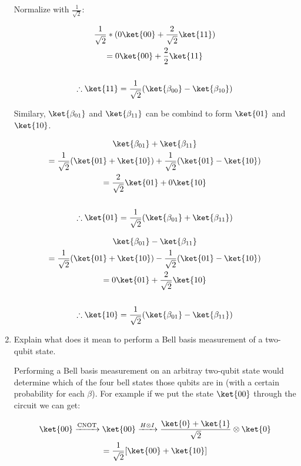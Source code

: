 \documentclass[]{article}
\begin{document}
\begin{enumerate}
        Normalize with $\frac{1}{\sqrt{2}}$:

        \begin{gather*}
          \frac{1}{\sqrt{2}} * (0  \ket{00} + \frac{2}{\sqrt{2}} \ket{11})\\
          =  0 \ket{00} + \frac{2}{2} \ket{11} \\ \\
          \therefore \ket{11} = \frac{1}{\sqrt{2}}(\ket{\beta_{00}} - \ket{\beta_{10}})
        \end{gather*}
        
        Similary, $\ket{\beta_{01}}$ and $\ket{\beta_{11}}$ can be combind to form $\ket{01}$ and $\ket{10}$.

        \begin{gather*}
          \ket{\beta_{01}} + \ket{\beta_{11}} \\
          = \frac{1}{\sqrt{2}} (\ket{01} + \ket{10}) + \frac{1}{\sqrt{2}} (\ket{01} - \ket{10})\\
          = \frac{2}{\sqrt{2}} \ket{01} + 0 \ket{10} \\ \\
          \therefore \ket{01} = \frac{1}{\sqrt{2}}(\ket{\beta_{01}} + \ket{\beta_{11}})
        \end{gather*}

        \begin{gather*}
          \ket{\beta_{01}} - \ket{\beta_{11}} \\
          = \frac{1}{\sqrt{2}} (\ket{01} + \ket{10}) - \frac{1}{\sqrt{2}} (\ket{01} - \ket{10})\\
          = 0 \ket{01} + \frac{2}{\sqrt{2}} \ket{10} \\ \\
          \therefore \ket{10} = \frac{1}{\sqrt{2}}(\ket{\beta_{01}} - \ket{\beta_{11}})
        \end{gather*}

  \item Explain what does it mean to perform a Bell basis measurement of a two-qubit state.

    Performing a Bell basis measurement on an arbitray two-qubit state would determine which of 
    the four bell states those qubits are in (with a certain probability for each $\beta$). For 
    example if we put the state $\ket{00}$ through the circuit we can get:

    \begin{gather*}
      \ket{00} \xrightarrow{\text{CNOT}} \ket{00} \xrightarrow{H \otimes I} 
      \frac{\ket{0} + \ket{1}}{\sqrt{2}} \otimes \ket{0}\\
      = \frac{1}{\sqrt{2}}[\ket{00} + \ket{10}]
    \end{gather*}


\end{enumerate}
\end{document}
